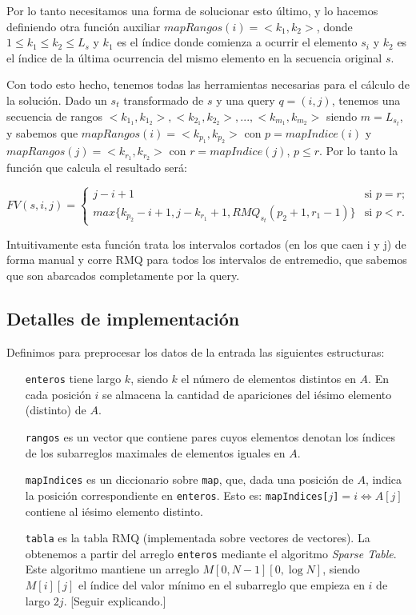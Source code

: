 Por lo tanto necesitamos una forma de solucionar esto último, y lo hacemos definiendo
otra función auxiliar $mapRangos(i) = <k_1, k_2>$, donde $1 \le k_1 \le k_2 \le L_s$
y $k_1$ es el índice donde comienza a ocurrir el elemento $s_i$ y $k_2$ es el índice
de la última ocurrencia del mismo elemento en la secuencia original $s$.

Con todo esto hecho, tenemos todas las herramientas necesarias para el cálculo de
la solución. Dado un $s_t$ transformado de $s$ y una query $q = (i, j)$, tenemos una
secuencia de rangos $<k_{1_1}, k_{1_2}>, <k_{2_1}, k_{2_2}>, ..., <k_{m_1}, k_{m_2}>$
siendo $m = L_{s_t}$, y sabemos que $mapRangos(i) = <k_{p_1}, k_{p_2}>$ con
$p = mapIndice(i)$ y $mapRangos(j) = <k_{r_1}, k_{r_2}>$ con $r = mapIndice(j)$, $p \le r$.
Por lo tanto la función que calcula el resultado será:

\[ FV(s, i, j) = \left\{ \begin{array}{ll}
                 j - i + 1 & \mbox{si $p = r$};\\
                 max\{ k_{p_2} - i + 1, j - k_{r_1} + 1, RMQ_{s_t}(p_2 + 1, r_1 - 1) \} & \mbox{si $p < r$}.\end{array} \right. \]
     
Intuitivamente esta función trata los intervalos cortados (en los que caen i y j) de forma
manual y corre RMQ para todos los intervalos de entremedio, que sabemos que son abarcados
completamente por la query.

\subsection*{Detalles de implementación}

Definimos para preprocesar los datos de la entrada las siguientes estructuras:

\begin{itemize}
  \item[\tt enteros] tiene largo $k$, siendo $k$ el número de elementos
  distintos en $A$. En cada posición $i$ se almacena la cantidad de apariciones
  del iésimo elemento (distinto) de $A$.

  \item[\tt rangos] es un vector que contiene pares cuyos elementos denotan
  los índices de los subarreglos maximales de elementos iguales en $A$.

  \item[\tt mapIndices] es un diccionario sobre {\tt map}, que, dada una
  posición de $A$, indica la posición correspondiente en {\tt enteros}. Esto es:
  {\tt mapIndices[$j$]}$=i \Leftrightarrow A[j]$ contiene al iésimo elemento
  distinto.

  \item[\tt tabla] es la tabla RMQ (implementada sobre vectores de vectores).
  La obtenemos a partir del arreglo {\tt enteros} mediante el algoritmo {\sl
  Sparse Table}. Este algoritmo mantiene un arreglo $M[0,N-1][0,\log N]$,
  siendo $M[i][j]$ el índice del valor mínimo en el subarreglo que empieza en
  $i$ de largo $2j$. [Seguir explicando.] \cite{topcoder}
\end{itemize}

